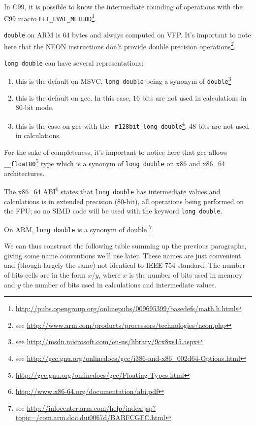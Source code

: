 In C99, it is possible to know the intermediate rounding of operations with the C99 macro \texttt{FLT\_EVAL\_METHOD}\footnote{\url{http://pubs.opengroup.org/onlinepubs/009695399/basedefs/math.h.html}}.

\texttt{double} on ARM is 64 bytes and always computed on VFP. It's important to note here that the NEON instructions don't provide double precision operations\footnote{see \url{http://www.arm.com/products/processors/technologies/neon.php}}.


\texttt{long double} can have several representations:
\begin{enumerate}
\item[\enumstyle{64-bit}] this is the default on MSVC, \texttt{long double} being a synonym of \texttt{double}\footnote{see \url{http://msdn.microsoft.com/en-us/library/9cx8xs15.aspx}}
\item[\enumstyle{96-bit}] this is the default on gcc. In this case, 16 bits are not used in calculations in 80-bit mode.
\item[\enumstyle{128-bit}] this is the case on gcc with the \texttt{-m128bit-long-double}\footnote{see \url{http://gcc.gnu.org/onlinedocs/gcc/i386-and-x86\_002d64-Options.html}}. 48 bits are not used in calculations.
\end{enumerate}

For the sake of completeness, it's important to notice here that gcc allows \texttt{\_\_float80}\footnote{\url{http://gcc.gnu.org/onlinedocs/gcc/Floating-Types.html}} type which is a synonym of \texttt{long double} on x86 and x86\_64 architectures.


The x86\_64 ABI\footnote{\url{http://www.x86-64.org/documentation/abi.pdf}} states that \texttt{long double} has intermediate values and calculations is in extended precision (80-bit), all operations being performed on the FPU; so no SIMD code will be used with the keyword \texttt{long double}.

On ARM, \texttt{long double} is a synonym of double \footnote{see \url{http://infocenter.arm.com/help/index.jsp?topic=/com.arm.doc.dui0067d/BABFCGFC.html}}.


We can thus construct the following table summing up the previous paragraphs, giving some name conventions we'll use later. These names are just convenient and (though largely the same) not identical to IEEE-754 standard. The number of bits cells are in the form $x$/$y$, where $x$ is the number of bits used in memory and $y$ the number of bits used in calculations and intermediate values.

